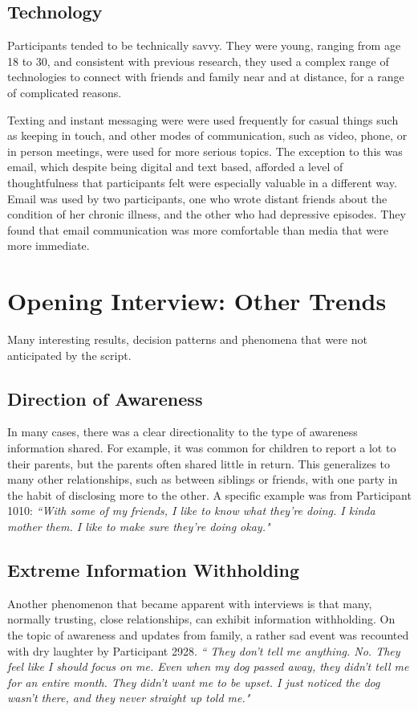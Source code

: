   \subsection{Technology}
  Participants tended to be technically savvy.
  They were young, ranging from age 18 to 30,
  and consistent with previous research,
  they used a complex range of technologies to connect
  with friends and family near and at distance,
  for a range of complicated reasons.

  Texting and instant messaging were
  were used frequently for casual things such as keeping in touch,
  and other modes of communication, such as video, phone, or in person meetings,
  were used for more serious topics.
  The exception to this was email,
  which despite being digital and text based, 
  afforded a level of thoughtfulness that participants
  felt were especially valuable in a different way.
  Email was used by two participants, one who wrote distant friends about
  the condition of her chronic illness,
  and the other who had depressive episodes.
  They found that email communication was more comfortable than media
  that were more immediate.

\section{Opening Interview: Other Trends}
  Many interesting results, decision patterns and phenomena
  that were not anticipated by the script.

  \subsection{Direction of Awareness}
  In many cases, there was a clear directionality to the type of awareness
  information shared.
  For example, it was common for children to report a lot to their parents,
  but the parents often shared little in return.
  This generalizes to many other relationships, such as between siblings or friends,
  with one party in the habit of disclosing more to the other.
  A specific example was from Participant 1010:
  \textit{
  ``With some of my friends, I like to know what they're doing.
  I kinda mother them.
  I like to make sure they're doing okay."
  }

  \subsection{Extreme Information Withholding}
  Another phenomenon that became apparent with interviews is that
  many, normally trusting, close relationships,
  can exhibit information withholding.
  On the topic of awareness and updates from family,
  a rather sad event was recounted with dry laughter by Participant 2928.
  \textit{
    ``
    They don't tell me anything. No.
    They feel like I should focus on me.
    Even when my dog passed away, they didn't tell me for an entire month.
    They didn't want me to be upset.
    I just noticed the dog wasn't there, and they never straight up told me."
  }

